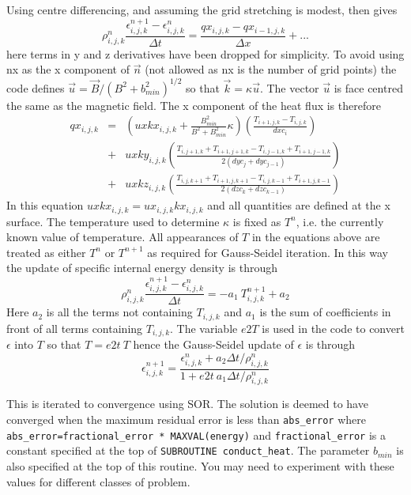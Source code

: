 \documentclass[11pt]{article}
\begin{document}
Using centre differencing, and assuming the grid stretching is modest,  then gives
\[
\rho_{i,j,k}^n \frac{\epsilon_{i,j,k}^{n+1}- \epsilon_{i,j,k}^{n}}{\Delta t}  =
\frac{qx_{i,j,k}- qx_{i-1,j,k}}{\Delta x} + ...
\]
here terms in y and z derivatives have been dropped for simplicity. To avoid using nx as the x component of $\vec{n}$ (not allowed as nx is the number of grid points) the code defines $\vec{u}=\vec{B}/(B^2+b_{min}^2)^{1/2}$ so that $\vec{k} = \kappa \vec{u}$. The vector $\vec{u}$ is face centred the same as the magnetic field. The x component of the heat flux is therefore
\begin{eqnarray*}
qx_{i,j,k}&=&\left(uxkx_{i,j,k} + \frac{B_{min}^2}{B^2+B_{min}^2}\kappa \right)\left(\frac{T_{i+1,j,k}-T_{i,j,k}}{dxc_i}
    \right) \\
    &+& uxky_{i,j,k}\left(\frac{T_{i,j+1,k}+T_{i+1,j+1,k}-T_{i,j-1,k}+T_{i+1,j-1,k}}{2(dyc_j+dyc_{j-1})} \right) \\
    &+& uxkz_{i,j,k}\left(\frac{T_{i,j,k+1}+T_{i+1,j,k+1}-T_{i,j,k-1}+T_{i+1,j,k-1}}{2(dzc_k+dzc_{k-1})} \right)
\end{eqnarray*}
In this equation $uxkx_{i,j,k}=ux_{i,j,k}kx_{i,j,k}$ and all quantities are defined at the x surface. The temperature used to determine $\kappa$ is fixed as $T^n$, i.e. the currently known value of temperature. All appearances of $T$ in the equations above are treated as either $T^n$ or $T^{n+1}$ as required for Gauss-Seidel iteration. In this way the update of specific internal energy density is through
\[
\rho_{i,j,k}^n \frac{\epsilon_{i,j,k}^{n+1}- \epsilon_{i,j,k}^{n}}{\Delta t}  =  - a_1\ T_{i,j,k}^{n+1} + a_2
\]
Here $a_2$ is all the terms not containing $T_{i,j,k}$ and $a_1$ is the sum of coefficients in front of all terms containing
$T_{i,j,k}$.
The variable $e2T$ is used in the code to convert $\epsilon$ into $T$ so that $T=e2t \ T$ hence the Gauss-Seidel update of $\epsilon$ is through
\[
\epsilon_{i,j,k}^{n+1}=\frac{\epsilon_{i,j,k}^{n} + a_2 \Delta t /\rho_{i,j,k}^n}{1+e2t\ a_1 \Delta t /\rho_{i,j,k}^n}
\]

This is iterated to convergence using SOR. The solution is deemed to have converged when the maximum residual error is less than \texttt{abs\_error} where \texttt{abs\_error=fractional\_error * MAXVAL(energy)} and \texttt{fractional\_error} is a constant specified at the top of {\tt SUBROUTINE conduct\_heat}. The parameter $b_{min}$ is also specified at the top of this routine. You may need to experiment with these values for different classes of problem.
\end{document}
